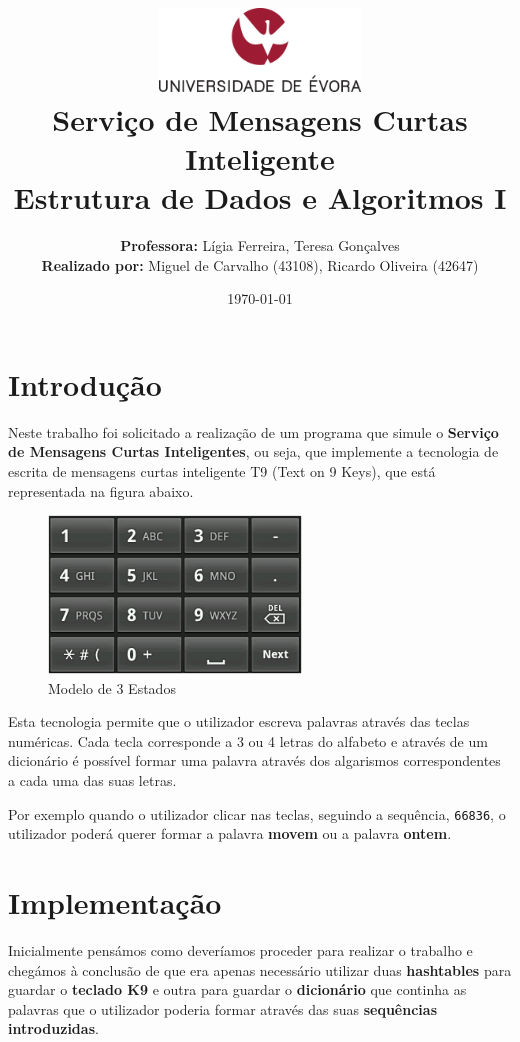 \documentclass[11pt]{article}
\title
{
    \includegraphics[width=0.4\textwidth]{images/ue_logo.png}
    \\[0.1cm]
    \textbf{Serviço de Mensagens Curtas Inteligente} \\
    Estrutura de Dados e Algoritmos I
}
\author
{
    \textbf{Professora:} Lígia Ferreira, Teresa Gonçalves \\
    \textbf{Realizado por:} Miguel de Carvalho (43108), Ricardo Oliveira (42647)
}
\date{\today}
\begin{document}
\maketitle

\section{Introdução}

\hspace{0,5cm}Neste trabalho foi solicitado a realização de um programa que simule o \textbf{Serviço de Mensagens Curtas Inteligentes}, ou seja, que implemente a tecnologia de escrita de mensagens curtas inteligente T9 (Text on 9 Keys), que está representada na figura abaixo.

\begin{figure}[h!]
    \begin{center}
        \includegraphics[width=0.6\textwidth]{images/t9_keys.png}
        \caption{Modelo de 3 Estados}
    \end{center}
\end{figure}

Esta tecnologia permite que o utilizador escreva palavras através das teclas numéricas. Cada tecla corresponde a 3 ou 4 letras do alfabeto e através de um dicionário é possível formar uma palavra através dos algarismos correspondentes a cada uma das suas letras.

Por exemplo quando o  utilizador clicar nas teclas, seguindo a sequência, \verb|66836|, o utilizador poderá querer formar a palavra \textbf{movem} ou a palavra \textbf{ontem}.
\section{Implementação}

\hspace{0,5cm}Inicialmente pensámos como deveríamos proceder para realizar o trabalho e chegámos à conclusão de que era apenas necessário utilizar duas \textbf{hashtables} para guardar o \textbf{teclado K9} e outra para guardar o \textbf{dicionário} que continha as palavras que o utilizador poderia formar através das suas \textbf{sequências introduzidas}.
\end{document}
